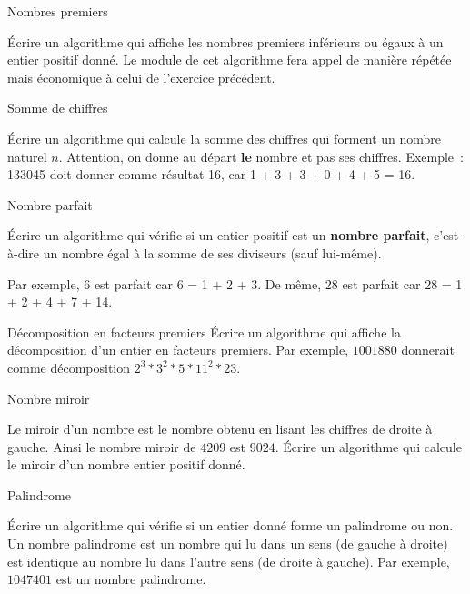 	\begin{Exercice}{Nombres premiers}

		Écrire un algorithme qui affiche les nombres premiers inférieurs ou
		égaux à un entier positif donné. Le module de cet algorithme fera appel
		de manière répétée mais économique à celui de l’exercice précédent.
	\end{Exercice}

	\begin{Exercice}{Somme de chiffres}

		Écrire un algorithme qui calcule la somme des chiffres qui forment un
		nombre naturel $n$. Attention, on donne au départ \textbf{le} nombre et
		pas ses chiffres. Exemple~: 133045 doit donner comme résultat 16,
		car 1 + 3 + 3 + 0 + 4 + 5 = 16.
	\end{Exercice}

	\begin{Exercice}{Nombre parfait}

		Écrire un algorithme qui vérifie si un entier positif est un
		\textbf{nombre parfait}, c’est-à-dire un nombre égal à la somme de ses
		diviseurs (sauf lui-même). 

		Par exemple, 6 est parfait car 6 = 1 + 2 + 3. 
		De même, 28 est parfait car 28 = 1 + 2 + 4 + 7 + 14.
	\end{Exercice}

	\begin{Exercice}{Décomposition en facteurs premiers}
		Écrire un algorithme qui affiche la décomposition 
		d’un entier en facteurs premiers. 
		Par exemple, $1001880$ donnerait comme décomposition
		$2^3 * 3^2 * 5 * 11^2 * 23$.
	\end{Exercice}

	\begin{Exercice}{Nombre miroir}

		Le miroir d’un nombre est le nombre obtenu
		en lisant les chiffres de droite à gauche.
		Ainsi le nombre miroir de $4209$ est $9024$.
		Écrire un algorithme qui calcule le miroir
		d’un nombre entier positif donné.
	\end{Exercice}

	\begin{Exercice}{Palindrome}

		Écrire un algorithme qui vérifie si un entier donné 
		forme un palindrome ou non. 
		Un nombre palindrome est un nombre qui lu dans un sens 
		(de gauche à droite) est identique au nombre lu dans l’autre sens 
		(de droite à gauche). 
		Par exemple, $1047401$ est un nombre palindrome.
	\end{Exercice}

